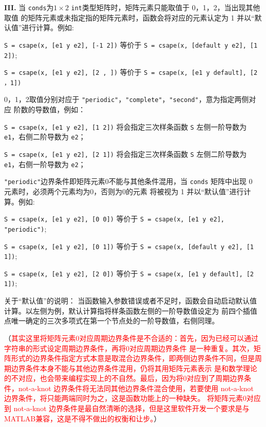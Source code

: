 \textbf{III.} 当 \texttt{conds}为$1 \times 2$ \texttt{int}类型矩阵时，矩阵元素只能取值于 0，1，2，当出现其他取值
的矩阵元素或未指定指的矩阵元素时，函数会将对应的元素认定为 1 并以“默认值”进行计算。例如:

\texttt{S = csape(x, [e1 y e2], [-1 2])} 等价于 \texttt{S = csape(x, [default y e2], [1 2])};

\texttt{S = csape(x, [e1 y e2], [2 , ])} 等价于 \texttt{S = csape(x, [e1 y default], [2 ，1])}

\hspace*{\fill}

0，1，2取值分别对应于 \lstinline|"periodic"|，\lstinline|"complete"|，\lstinline|"second"|，意为指定两侧对应
阶数的导数值，例如：

\texttt{S = csape(x, [e1 y e2], [1 2])} 将会指定三次样条函数 \texttt{S} 左侧一阶导数为 \texttt{e1}，右侧二阶导数为 \texttt{e2}；

\texttt{S = csape(x, [e1 y e2], [2 1])} 将会指定三次样条函数 \texttt{S} 左侧二阶导数为 \texttt{e1}，右侧一阶导数为 \texttt{e2}；

\hspace*{\fill}

\lstinline|"periodic"|边界条件即矩阵元素0不能与其他条件混用，当 \texttt{conds} 矩阵中出现 0 元素时，必须两个元素均为0，否则为0的元素
将被视为 1 并以“默认值”进行计算。例如:

\texttt{S = csape(x, [e1 y e2], [0 0])} 等价于 \texttt{S = csape(x, [e1 y e2], \lstinline{"periodic"})};

\texttt{S = csape(x, [e1 y e2], [0 1])} 等价于 \texttt{S = csape(x, [default y e2], [1 1])};

\texttt{S = csape(x, [e1 y e2], [2 0])} 等价于 \texttt{S = csape(x, [e1 y default], [2 1])};

\hspace*{\fill}

关于“默认值”的说明： 当函数输入参数错误或者不足时，函数会自动启动默认值计算。以左侧为例，默认计算指将样条函数左侧的一阶导数值设定为
前四个插值点唯一确定的三次多项式在第一个节点处的一阶导数值，右侧同理。

（\textcolor{red}{\kaishu 其实这里将矩阵元素0对应周期边界条件是不合适的：首先，因为已经可以通过字符串的形式设定周期边界条件，再将0对应周期边界条件
    是一种重复。其次，矩阵形式的边界条件指定方式本意是取混合边界条件，即两侧边界条件不同，但是周期边界条件本身不能与其他边界条件混用，仍将其用矩阵元素表示
    是和数学理论的不对应，也会带来编程实现上的不自然。最后，因为将0对应到了周期边界条件，not-a-knot 边界条件将无法同其他边界条件混合使用，若要使用
    not-a-knot 边界条件，将只能两端同时为之，这是函数功能上的一种缺失。
    将矩阵元素0对应到 not-a-knot 边界条件是最自然清晰的选择，但是这里软件开发一个要求是与MATLAB兼容，这是不得不做出的权衡和让步。}）
